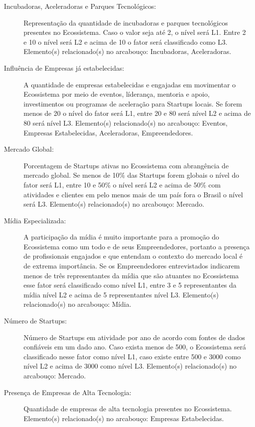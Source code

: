 \begin{description}
  \item [Incubadoras, Aceleradoras e Parques Tecnológicos:] Representação da quantidade de incubadoras e parques tecnológicos presentes no Ecossistema. Caso o valor seja até 2, o nível será L1. Entre 2 e 10 o nível será L2 e acima de 10 o fator será classificado como L3. Elemento(s) relacionado(s) no arcabouço: Incubadoras, Aceleradoras.
  
  \item [Influência de Empresas já estabelecidas:] A quantidade de empresas estabelecidas e engajadas em movimentar o Ecossistema por meio de eventos, líderança, mentoria e apoio, investimentos ou programas de aceleração para Startups locais. Se forem menos de 20 o nível do fator será L1, entre 20 e 80 será nível L2 e acima de 80 será nível L3. Elemento(s) relacionado(s) no arcabouço: Eventos, Empresas Estabelecidas, Aceleradoras, Empreendedores.
  
  \item [Mercado Global:] Porcentagem de Startups ativas no Ecossistema com abrangência de mercado global. Se menos de 10\% das Startups forem globais o nível do fator será L1, entre 10 e 50\% o nível será L2 e acima de 50\% com atividades e clientes em pelo menos mais de um país fora o Brasil o nível será L3. Elemento(s) relacionado(s) no arcabouço: Mercado.
  
  \item [Mídia Especializada:] A participação da mídia é muito importante para a promoção do Ecossistema como um todo e de seus Empreendedores, portanto a presença de profissionais engajados e que entendam o contexto do mercado local é de extrema importância. Se os Empreendedores entrevistados indicarem menos de três representantes da mídia que são atuantes no Ecossistema esse fator será classificado como nível L1, entre 3 e 5 representantes da mídia nível L2 e acima de 5 representantes nível L3. Elemento(s) relacionado(s) no arcabouço: Mídia.
  
  \item [Número de Startups:] Número de Startups em atividade por ano de acordo com fontes de dados confiáveis em um dado ano. Caso exista menos de 500, o Ecossistema será classificado nesse fator como nível L1, caso existe entre 500 e 3000 como nível L2 e acima de 3000 como nível L3. Elemento(s) relacionado(s) no arcabouço: Mercado.
  
  \item [Presença de Empresas de Alta Tecnologia:] Quantidade de empresas de alta tecnologia presentes no Ecossistema. Elemento(s) relacionado(s) no arcabouço: Empresas Estabelecidas.
  

\end{description}
